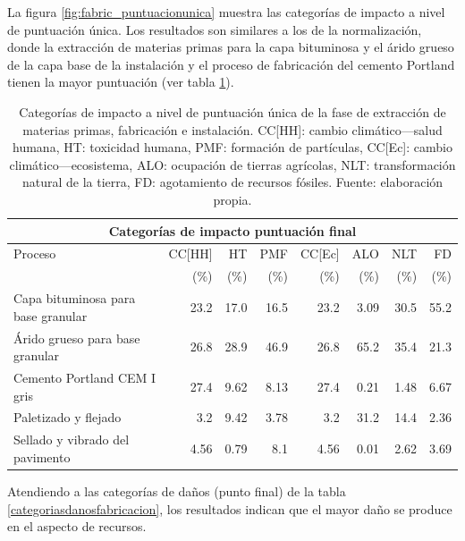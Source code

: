 La figura \ref{fig:fabric_puntuacionunica} muestra las categorías de impacto a nivel de puntuación única. Los resultados son similares a los de la normalización, donde la extracción de materias primas para la capa bituminosa y el árido grueso de la capa base de la instalación y el proceso de fabricación del cemento Portland tienen la mayor puntuación (ver tabla \ref{categoriasimpactofabricacionpuntunica}).

\begin{table}[!htb]
\centering
\begin{tabular}{p{4cm}rrrrrrr}
\toprule
\multicolumn{8}{c}{Categorías de impacto puntuación final}\\
\midrule
Proceso & CC[HH] & HT & PMF & CC[Ec] & ALO & NLT & FD\\
 &  (\%) & (\%) & (\%) & (\%) & (\%) & (\%) & (\%)\\
\midrule
Capa bituminosa para base granular & 23.2 & 17.0 & 16.5 & 23.2 & 3.09 & 30.5 & 55.2\\
Árido grueso para base granular & 26.8 & 28.9 & 46.9 & 26.8 & 65.2 & 35.4 & 21.3\\
Cemento Portland CEM I gris & 27.4 & 9.62 & 8.13 & 27.4 & 0.21 & 1.48 & 6.67\\
Paletizado y flejado & 3.2 & 9.42 & 3.78 & 3.2 & 31.2 & 14.4 & 2.36\\
Sellado y vibrado del pavimento & 4.56 & 0.79 & 8.1 & 4.56 & 0.01 & 2.62 & 3.69\\
\bottomrule
\end{tabular}
\caption[Categorías de impacto a nivel de puntuación única de la fase de extracción de materias primas, fabricación e instalación.]{Categorías de impacto a nivel de puntuación única de la fase de extracción de materias primas, fabricación e instalación. CC[HH]: cambio climático—salud humana, HT: toxicidad humana, PMF: formación de partículas, CC[Ec]: cambio climático—ecosistema, ALO: ocupación de tierras agrícolas, NLT: transformación natural de la tierra, FD: agotamiento de recursos fósiles. Fuente: elaboración propia.}
\label{categoriasimpactofabricacionpuntunica}
\end{table}

Atendiendo a las categorías de daños (punto final) de la tabla \ref{categoriasdanosfabricacion}, los resultados indican que el mayor daño se produce en el aspecto de recursos.

